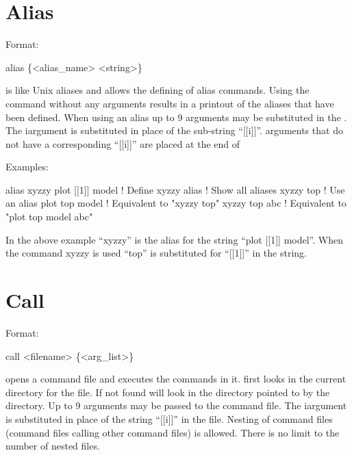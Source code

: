 \vfil
\break

\section{Alias}
\label{s:alias}

Format: 
\begin{example}
  alias \{<alias_name> <string>\}
\end{example}

\vskip 0.2in

 is like Unix aliases and allows the defining of alias
commands. Using the  command without any arguments results
in a printout of the aliases that have been defined. When using an
alias up to 9 arguments may be substituted in the . The
i\Th argument is substituted in place of the sub-string ``[[i]]''.
arguments that do not have a corresponding ``[[i]]'' are placed at the end
of 

Examples:
\begin{example}
    alias xyzzy plot [[1]] model  ! Define xyzzy
    alias                         ! Show all aliases
    xyzzy top                     ! Use an alias
    plot top model                ! Equivalent to "xyzzy top"
    xyzzy top abc                 ! Equivalent to "plot top model abc"
\end{example}
In the above example ``xyzzy'' is the alias for the string ``plot [[1]]
model''.  When the command xyzzy is used ``top'' is substituted
for ``[[1]]'' in the string.

\section{Call}
\label{s:call}

Format: 
\begin{example}
  call <filename> \{<arg_list>\}  \Strut
\end{example}

\vskip 0.2in 
 opens a command file and executes the commands
in it.  \tao first looks in the current directory for the file. If not
found \tao will look in the directory pointed to by the
 directory.  Up to 9 arguments may be passed to
the command file. The i\Th argument is substituted in place of the
string ``[[i]]'' in the file. Nesting of command files (command files
calling other command files) is allowed. There is no limit to the
number of nested files.

